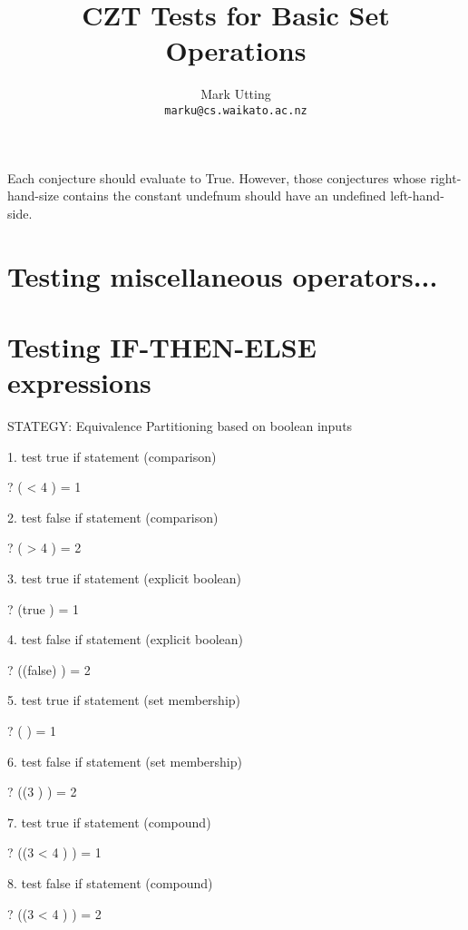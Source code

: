 \documentclass{article}
\title{CZT Tests for Basic Set Operations}
\author{Mark Utting \\ \texttt{marku@cs.waikato.ac.nz}}
\begin{document}
\maketitle

Each conjecture should evaluate to True.
However, those conjectures whose right-hand-size contains
the constant undefnum should have an undefined left-hand-side.


\section{Testing miscellaneous operators...}


\section{Testing IF-THEN-ELSE expressions}

 STATEGY: Equivalence Partitioning based on boolean inputs

 1. test true if statement (comparison)
\begin{zed} \vdash? ( < 4  ) = 1 \end{zed}
 2. test false if statement (comparison)
\begin{zed} \vdash? ( > 4  ) = 2 \end{zed}

 3. test true if statement (explicit boolean)
\begin{zed} \vdash? (\IF true  ) = 1 \end{zed}
 4. test false if statement (explicit boolean)
\begin{zed} \vdash? (\IF (false)  ) = 2 \end{zed}

 5. test true if statement (set membership)
\begin{zed} \vdash? ( \in \nat {} ) = 1 \end{zed}
 6. test false if statement (set membership)
\begin{zed} \vdash? (\IF (3 \notin \nat)  ) = 2 \end{zed}

 7. test true if statement (compound)
\begin{zed} \vdash? (\IF (3 < 4  \in \nat)  ) = 1 \end{zed}
 8. test false if statement (compound)
\begin{zed} \vdash? (\IF \lnot (3 < 4  \in \nat)  ) = 2 \end{zed}
\end{document}
